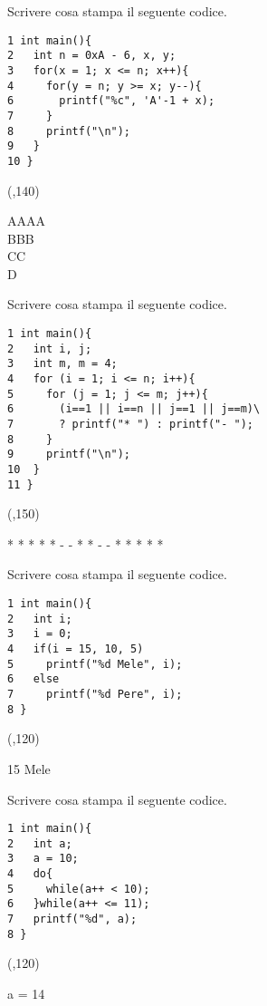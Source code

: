 \documentclass[addpoints,12pt]{exam}
\begin{document}
\begin{center}
\end{center}

\begin{questions}
    \boxedpoints
    \question[3] Scrivere cosa stampa il seguente codice.
    \setlength{\columnsep}{2cm}
    \begin{multicols}{2}
    \begin{verbatim}
1 int main(){
2   int n = 0xA - 6, x, y;
3   for(x = 1; x <= n; x++){
4     for(y = n; y >= x; y--){
6       printf("%c", 'A'-1 + x);
7     }
8     printf("\n");
9   }
10 }
    \end{verbatim}
    \columnbreak
    \framebox(\linewidth,140){\parbox{1.5cm}{
    AAAA\\
    BBB\\
    CC\\
    D
    }}
    \end{multicols}
    \question[3] Scrivere cosa stampa il seguente codice.
    \setlength{\columnsep}{2cm}
    \begin{multicols}{2}
    \begin{verbatim}
1 int main(){
2   int i, j;
3   int m, m = 4;
4   for (i = 1; i <= n; i++){
5     for (j = 1; j <= m; j++){
6       (i==1 || i==n || j==1 || j==m)\
7       ? printf("* ") : printf("- ");
8     }
9     printf("\n");
10  }
11 }
    \end{verbatim}
    \columnbreak
    \framebox(\linewidth,150){\parbox{1.5cm}{
    * * * * \newline
    * - \space- * \newline
    * - \space- * \newline
    * * * *
    }}
    \end{multicols}

    \question[1] Scrivere cosa stampa il seguente codice.
    \setlength{\columnsep}{2cm}
    \begin{multicols}{2}
    \begin{verbatim}
1 int main(){
2   int i;
3   i = 0;
4   if(i = 15, 10, 5)
5     printf("%d Mele", i);
6   else
7     printf("%d Pere", i);
8 }
    \end{verbatim}
    \columnbreak
    \framebox(\linewidth,120){\parbox{1.5cm}{
    15 Mele
    }}
    \end{multicols}
    
    \newpage
    \thispagestyle{empty}
    \question[2] Scrivere cosa stampa il seguente codice.
    \setlength{\columnsep}{2cm}
    \begin{multicols}{2}
    \begin{verbatim}
1 int main(){
2   int a;
3   a = 10;
4   do{
5     while(a++ < 10);
6   }while(a++ <= 11);
7   printf("%d", a);
8 }
    \end{verbatim}
    \columnbreak
    \framebox(\linewidth,120){\parbox{1.5cm}{
    a = 14
    }}
    \end{multicols}


\end{questions}
\end{document}
